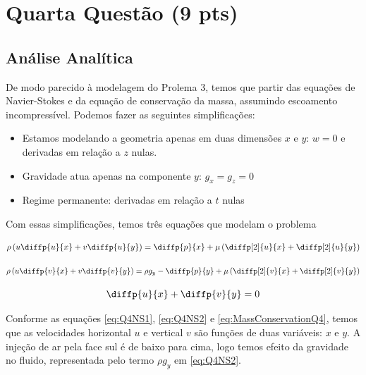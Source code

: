 
\section{Quarta Questão (9 pts)}

\subsection{Análise Analítica}


De modo parecido à modelagem do Prolema 3, temos que partir das equações de Navier-Stokes e 
da equação de conservação da massa, assumindo escoamento incompressível. 
Podemos fazer as seguintes simplificações:

\begin{itemize}
    \item Estamos modelando a geometria apenas em duas dimensões $x$ e $y$: $w = 0$ e derivadas em relação a $z$ nulas.
    \item Gravidade atua apenas na componente $y$: $g_x = g_z = 0$
    \item Regime permanente: derivadas em relação a $t$ nulas
\end{itemize}

Com essas simplificações, temos três equações que modelam o problema

\begin{equation}\label{eq:Q4NS1}
        \rho\left(u\diffp{u}{x} + v\diffp{u}{y}\right)
         = \diffp{p}{x} + \mu \left(\diffp[2]{u}{x} + \diffp[2]{u}{y}\right)
\end{equation}

\begin{equation}\label{eq:Q4NS2}
        \rho\left(u\diffp{v}{x} + v\diffp{v}{y}\right)
         = \rho g_y - \diffp{p}{y} + \mu \left(\diffp[2]{v}{x} + \diffp[2]{v}{y}\right)
\end{equation}

\begin{equation}\label{eq:MassConservationQ4}
    \diffp{u}{x} + \diffp{v}{y} = 0
\end{equation}

Conforme as equações \eqref{eq:Q4NS1}, \eqref{eq:Q4NS2} e \eqref{eq:MassConservationQ4},
temos que as velocidades horizontal $u$ e vertical $v$ são funções de duas variáveis: $x$ e $y$.
A injeção de ar pela face sul é de baixo para cima, logo temos efeito da gravidade no fluido,
representada pelo termo $\rho g_y$ em \eqref{eq:Q4NS2}. 

